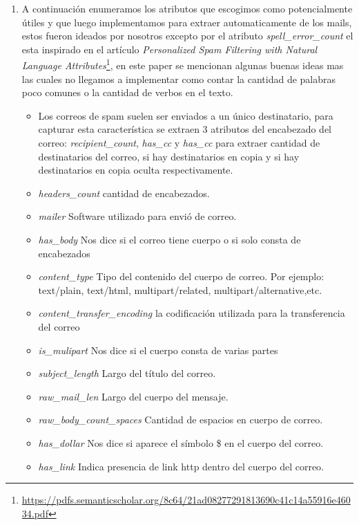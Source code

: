 
\begin{enumerate}

\item A continuación enumeramos los atributos que escogimos como potencialmente útiles y que luego implementamos para extraer automaticamente de los mails, estos fueron ideados por nosotros excepto por el atributo \textit{spell\_error\_count} el esta inspirado en el artículo \textit{Personalized Spam Filtering with
Natural Language Attributes}\footnote{\url{https://pdfs.semanticscholar.org/8c64/21ad08277291813690c41c14a55916e46034.pdf}}, en este paper se mencionan algunas buenas ideas mas las cuales no llegamos a implementar como contar la cantidad de palabras poco comunes o la cantidad de verbos en el texto.

\begin{itemize}
\item Los correos de spam suelen ser enviados a un único destinatario, para capturar esta característica se extraen 3 atributos del encabezado del correo: \textit{recipient\_count}, \textit{has\_cc} y \textit{has\_cc} para extraer cantidad de destinatarios del correo, si hay destinatarios en copia y si hay destinatarios en copia oculta respectivamente.
\item \textit{headers\_count} cantidad de encabezados.
\item \textit{mailer} Software utilizado para envió de correo. 
\item \textit{has\_body} Nos dice si el correo tiene cuerpo o si solo consta de encabezados
\item \textit{content\_type} Tipo del contenido del cuerpo de correo. Por ejemplo: text/plain, text/html, multipart/related, multipart/alternative,etc. 
\item \textit{content\_transfer\_encoding} la codificación utilizada para la transferencia del correo
\item \textit{is\_mulipart} Nos dice si el cuerpo consta de varias partes
\item \textit{subject\_length} Largo del título  del correo.
\item \textit{raw\_mail\_len} Largo del cuerpo del mensaje. 
\item \textit{raw\_body\_count\_spaces} Cantidad de espacios en cuerpo de correo.
\item \textit{has\_dollar} Nos dice si aparece el símbolo \$ en el cuerpo del correo. 
\item \textit{has\_link} Indica presencia de link http dentro del cuerpo del correo. 

\end{itemize}
\end{enumerate}
